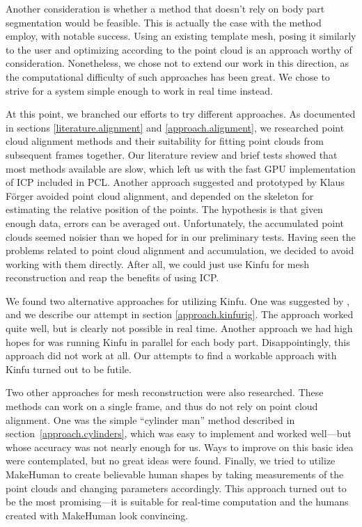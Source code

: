 Another consideration is whether a method that doesn't rely on body part segmentation would be feasible. This is actually the case with the method \citet{weiss2011home} employ, with notable success. Using an existing template mesh, posing it similarly to the user and optimizing according to the point cloud is an approach worthy of consideration. Nonetheless, we chose not to extend our work in this direction, as the computational difficulty of such approaches has been great. We chose to strive for a system simple enough to work in real time instead.

At this point, we branched our efforts to try different approaches. As documented in sections \ref{literature.alignment} and \ref{approach.alignment}, we researched point cloud alignment methods and their suitability for fitting point clouds from subsequent frames together. Our literature review and brief tests showed that most methods available are slow, which left us with the fast GPU implementation of ICP included in PCL. Another approach suggested and prototyped by Klaus Förger avoided point cloud alignment, and depended on the skeleton for estimating the relative position of the points. The hypothesis is that given enough data, errors can be averaged out. Unfortunately, the accumulated point clouds seemed noisier than we hoped for in our preliminary tests. Having seen the problems related to point cloud alignment and accumulation, we decided to avoid working with them directly. After all, we could just use Kinfu for mesh reconstruction and reap the benefits of using ICP.

We found two alternative approaches for utilizing Kinfu. One was suggested by \citet{charpentier2011accurate}, and we describe our attempt in section \ref{approach.kinfurig}. The approach worked quite well, but is clearly not possible in real time. Another approach we had high hopes for was running Kinfu in parallel for each body part. Disappointingly, this approach did not work at all. Our attempts to find a workable approach with Kinfu turned out to be futile.

Two other approaches for mesh reconstruction were also researched. These methods can work on a single frame, and thus do not rely on point cloud alignment. One was the simple ``cylinder man'' method described in section~\ref{approach.cylinders}, which was easy to implement and worked well---but whose accuracy was not nearly enough for us. Ways to improve on this basic idea were contemplated, but no great ideas were found. Finally, we tried to utilize MakeHuman to create believable human shapes by taking measurements of the point clouds and changing parameters accordingly. This approach turned out to be the most promising---it is suitable for real-time computation and the humans created with MakeHuman look convincing.

